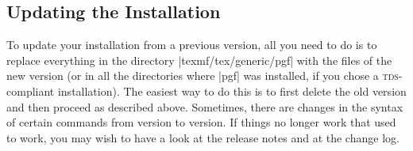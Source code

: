 \subsection{Updating the Installation}

To update your installation from a previous version, all you need to do is to
replace everything in the directory |texmf/tex/generic/pgf| with the files of
the new version (or in all the directories where |pgf| was installed, if you
chose a \textsc{tds}-compliant installation). The easiest way to do this is to
first delete the old version and then proceed as described above. Sometimes,
there are changes in the syntax of certain commands from version to version. If
things no longer work that used to work, you may wish to have a look at the
release notes and at the change log.
